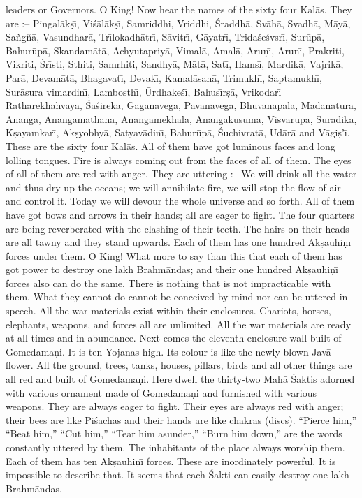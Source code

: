 leaders or Governors. O King! Now hear the names of the sixty four Kal\=as. They are :-- Pingal\=ak\d{s}\={\i}, Vi\'s\=al\=ak\d{s}\={\i}, Samriddhi, Vriddhi, \'Sraddh\=a, Sv\=ah\=a, Svadh\=a, M\=ay\=a, Sa\~ng\~n\=a, Vasundhar\=a, Tr\={\i}lokadh\=atr\={\i}, S\=avitr\={\i}, G\=ayatr\={\i}, Trida\'se\'svsr\={\i}, Sur\=up\=a, Bahur\=up\=a, Skandam\=at\=a, Achyutapriy\=a, Vimal\=a, Amal\=a, Aru\d{n}\={\i}, \=Arun\={\i}, Prakriti, Vikriti, \'Sr\={\i}sti, Sthiti, Samrhiti, Sandhy\=a, M\=at\=a, Sat\={\i}, Hams\={\i}, Mardik\=a, Vajrik\=a, Par\=a, Devam\=at\=a, Bhagavat\={\i}, Devak\={\i}, Kamal\=asan\=a, Trimukh\={\i}, Saptamukh\={\i}, Sur\=asura vimardin\={\i}, Lambosth\={\i}, \=Urdhake\'s\={\i}, Bahus\={\i}r\d{s}\=a, Vrikodar\={\i} Ratharekh\=ahvay\=a, \'Sa\'sirek\=a, Gaganaveg\=a, Pavanaveg\=a, Bhuvanap\=al\=a, Madan\=atur\=a, Anang\=a, Anangamathan\=a, Anangamekhal\=a, Anangakusum\=a, Visvar\=up\=a, Sur\=adik\=a, K\d{s}ayamkar\={\i}, Ak\d{s}yobhy\=a, Satyav\=adin\={\i}, Bahur\=up\=a, \'Suchivrat\=a, Ud\=ar\=a and V\=agi\d{s}'\={\i}. These are the sixty four Kal\=as. All of them have got luminous faces and long lolling tongues. Fire is always coming out from the faces of all of them. The eyes of all of them are red with anger. They are uttering :-- We will drink all the water and thus dry up the oceans; we will annihilate fire, we will stop the flow of air and control it. Today we will devour the whole universe and so forth. All of them have got bows and arrows in their hands; all are eager to fight. The four quarters are being reverberated with the clashing of their teeth. The hairs on their heads are all tawny and they stand upwards. Each of them has one hundred Ak\d{s}auhi\d{n}\={\i} forces under them. O King! What more to say than this that each of them has got power to destroy one lakh Brahm\=andas; and their one hundred Ak\d{s}auhi\d{n}\={\i} forces also can do the same. There is nothing that is not impracticable with them. What they cannot do cannot be conceived by mind nor can be uttered in speech. All the war materials exist within their enclosures. Chariots, horses, elephants, weapons, and forces all are unlimited. All the war materials are ready at all times and in abundance. Next comes the eleventh enclosure wall built of Gomedama\d{n}i. It is ten Yojanas high. Its colour is like the newly blown Jav\=a flower. All the ground, trees, tanks, houses, pillars, birds and all other things are all red and built of Gomedama\d{n}i. Here dwell the thirty-two Mah\=a \'Saktis adorned with various ornament made of Gomedama\d{n}i and furnished with various weapons. They are always eager to fight. Their eyes are always red with anger; their bees are like Pi\'s\=achas and their hands are like chakras (discs). ``Pierce him,'' ``Beat him,'' ``Cut him,'' ``Tear him asunder,'' ``Burn him down,'' are the words constantly uttered by them. The inhabitants of the place always worship them. Each of them has ten Ak\d{s}auhi\d{n}\={\i} forces. These are inordinately powerful. It is impossible to describe that. It seems that each \'Sakti can easily destroy one lakh Brahm\=andas.


